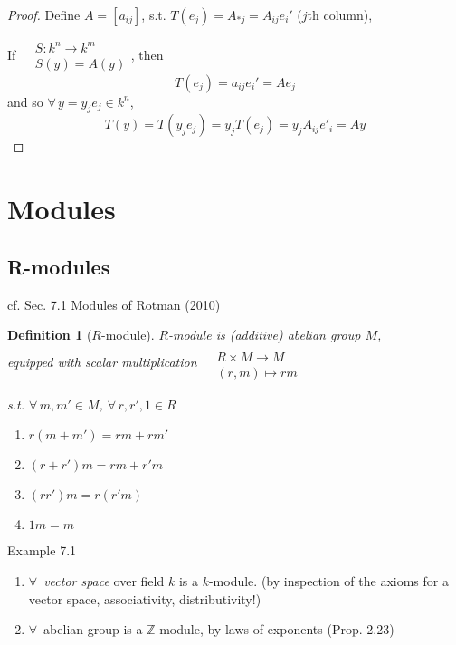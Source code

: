\documentclass[10pt]{amsart}
\newtheorem{definition}{Definition}
\begin{document}
\begin{multicols*}{2}
\begin{proof}
Define $A=[a_{ij}]$, s.t. $T(e_j) = A_{*j} = A_{ij} e_i'$ ($j$th column), 

If $\begin{aligned} 
& S:k^n \to k^m \\ 
& S(y) = A(y) \end{aligned}$, then 
\[
T(e_j) = a_{ij}e_i' = Ae_j
\]
and so $\forall \, y = y_je_j \in k^n$, 
\[
T(y) = T(y_je_j) = y_j T(e_j) = y_j A_{ij}e'_i = Ay
\]


	\end{proof}

\section{Modules}

\subsection{R-modules}

cf. Sec. 7.1 Modules of Rotman (2010) \cite{JRotman2010}

\begin{definition}[$R$-module]
	$R$-module is (additive) abelian group $M$, \\
	equipped with scalar multiplication $\begin{aligned} & \quad \\
	& R \times M \to M \\
	& (r,m) \mapsto rm \end{aligned}$ 
	
	s.t. $\forall \, m,m' \in M$, $\forall \, r,r',1 \in R$
	\begin{enumerate}
		\item[(i)] $r(m+m')=rm+rm'$
		\item[(ii)] $(r+r')m = rm+r'm$
		\item[(iii)] $(rr')m = r(r'm)$
		\item[(iv)] $1m = m$
	\end{enumerate}
\end{definition}

Example 7.1 \begin{enumerate}
	\item[(i)] $\forall \, $ \emph{vector space} over field $k$ is a $k$-module.  (by inspection of the axioms for a vector space, associativity, distributivity!)
	\item[(ii)] $\forall \, $ abelian group is a $\mathbb{Z}$-module, by laws of exponents (Prop. 2.23)
	

\end{enumerate}
\end{multicols*}
\end{document}
